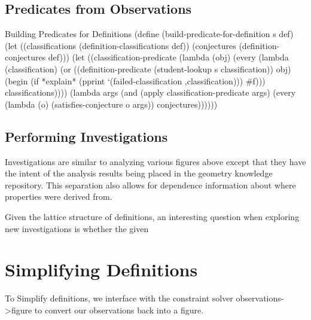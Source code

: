 \subsection{Predicates from Observations}

\begin{code-listing}{Building Predicates for Definitions}
(define (build-predicate-for-definition s def)
  (let ((classifications (definition-classifications def))
        (conjectures (definition-conjectures def)))
    (let ((classification-predicate
           (lambda (obj)
             (every
              (lambda (classification)
                (or ((definition-predicate (student-lookup s classification))
                     obj)
                    (begin (if *explain*
                               (pprint `(failed-classification
                                         ,classification)))
                           #f)))
              classifications))))
      (lambda args
        (and (apply classification-predicate args)
             (every (lambda (o) (satisfies-conjecture o args))
                    conjectures))))))
\end{code-listing}

\subsection{Performing Investigations}

Investigations are similar to analyzing various figures above except
that they have the intent of the analysis results being placed in the
geometry knowledge repository. This separation also allows for
dependence information about where properties were derived from.

Given the lattice structure of definitions, an interesting question when exploring
new investigations is whether the given

\section{Simplifying Definitions}

To Simplify definitions, we interface with the constraint solver
observations->figure to convert our observations back into a figure.

